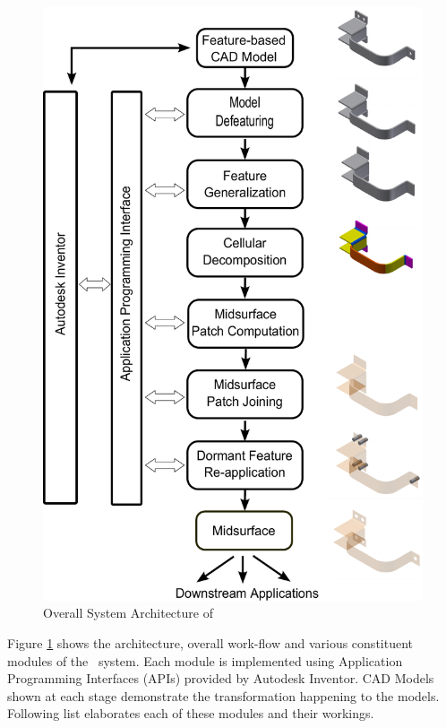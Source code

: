 

	 \begin{figure} [!h]
	\centering
	\includegraphics[width=0.62\linewidth]{images/SystemArchitecture_nolabels_7.pdf}
	\caption{Overall System Architecture of \mysystemname}
	\label{fig:proposal:OverallWorkflow}
	\end{figure}
	
	
Figure \ref{fig:proposal:OverallWorkflow} shows the architecture, overall work-flow and various constituent modules of the \mysystemname~system. Each module is implemented using Application Programming Interfaces (APIs)  provided by Autodesk Inventor. CAD Models shown at each stage demonstrate the transformation happening to the models. Following list elaborates each of these modules and their workings.
	
